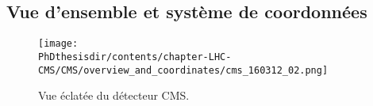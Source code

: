 \subsection{Vue d'ensemble et système de coordonnées}\label{chapter-LHC-section-CMS-subsec-overview_and_coordinates}

\begin{figure}[h]
\centering
\texttt{[image: \\PhDthesisdir/contents/chapter-LHC-CMS/CMS/overview\_and\_coordinates/cms\_160312\_02.png]}
\caption{Vue éclatée du détecteur CMS.}
\label{fig-chapter-LHC-section-CMS-subsec-overview_and_coordinates-vue_eclatee_CMS}
\end{figure}